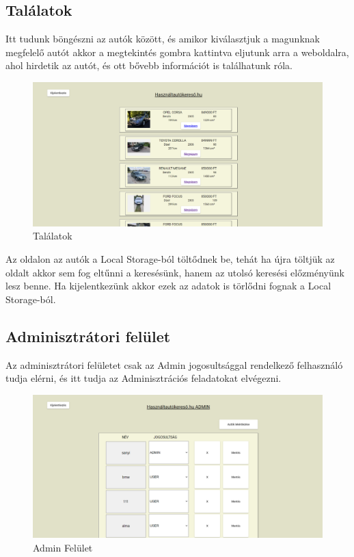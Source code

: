 \subsection{Találatok}

Itt tudunk böngészni az autók között, és amikor kiválasztjuk a magunknak megfelelő autót akkor a megtekintés gombra kattintva eljutunk arra a weboldalra, ahol hirdetik az autót, és ott bővebb információt is találhatunk róla.

\begin{figure}[h]
\centering
\includegraphics[scale=0.9]{images/Talalatok_FE.png}
\caption{Találatok}
\label{fig:Találatok}
\end{figure}

Az oldalon az autók a Local Storage-ból töltődnek be, tehát ha újra töltjük az oldalt akkor sem fog eltűnni a keresésünk, hanem az utolsó keresési előzményünk lesz benne. Ha kijelentkezünk akkor ezek az adatok is törlődni fognak a Local Storage-ból.
\newpage

\subsection{Adminisztrátori felület}

Az adminisztrátori felületet csak az Admin jogosultsággal rendelkező felhasználó tudja elérni, és itt tudja az Adminisztrációs feladatokat elvégezni.

\begin{figure}[h]
\centering
\includegraphics[scale=0.9]{images/Admin_FE.png}
\caption{Admin Felület}
\label{fig:Admin}
\end{figure}

